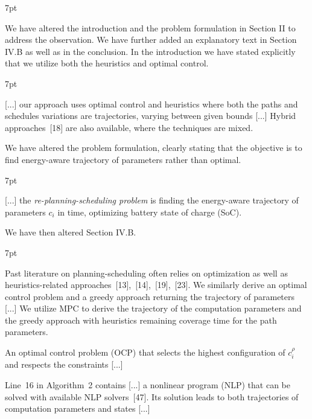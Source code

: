 \documentclass[10pt]{letter}
\newenvironment{formal}{%
  \def\FrameCommand{%
    \hspace{1pt}%
    {\color{red}\vrule width 2pt}%
    {\color{formalshade}\vrule width 4pt}%
    \colorbox{formalshade}%
  }%
  \MakeFramed{\advance\hsize-\width\FrameRestore}%
  \noindent\hspace{-4.55pt}%
  \begin{adjustwidth}{}{7pt}%
  \vspace{2pt}\vspace{2pt}%
}
{%
  \vspace{2pt}\end{adjustwidth}\endMakeFramed%
}
\begin{document}
{\begin{formal}
\begin{algorithmic}[1]
    \vspace*{.8ex}
  \end{algorithmic}
\end{formal}

  We have altered the introduction and the problem formulation in Section II to address the observation. We have further added an explanatory text in Section IV.B as well as in the conclusion. In the introduction we have stated explicitly that we utilize both the heuristics and optimal control.

  \begin{formal}
  {\color{black} [...] our approach uses optimal control {\color{blue} and heuristics} where both the paths and schedules variations are trajectories, varying between given bounds [...]} Hybrid approaches~[{\color{green}18}] are also available, where the techniques are mixed.
  \vspace*{1ex}
  \end{formal}

  We have altered the problem formulation, clearly stating that the objective is to find energy-aware trajectory of parameters rather than optimal.

  \begin{formal}
    {\color{black} [...] the \emph{re-planning-scheduling problem} is finding the {\color{blue}energy-aware} trajectory of parameters $c_i$ in time{\color{blue}, optimizing battery state of charge (SoC)}.}
    \vspace*{1ex}
  \end{formal}

  We have then altered Section IV.B.

  \begin{formal}
  \color{black}
  Past literature on planning-scheduling often relies on %
  optimization {\color{blue} as well as heuristics-}related approaches~[{\color{green}13}],~[{\color{green}14}],~[{\color{green}19}],~[{\color{green}23}]. We similarly derive an optimal control problem {\color{blue}and a greedy approach} returning the trajectory of parameters [...] {\color{blue} We utilize MPC to derive the trajectory of the computation parameters and the greedy approach with heuristics remaining coverage time for the path parameters.}

  An optimal control problem (OCP) that selects the highest configuration of {\color{blue} $c_i^\rho$} and respects the constraints [...]

  Line~{\color{red}16} in Algorithm~{\color{red}2} contains [...] a nonlinear program (NLP) that can be solved with available NLP solvers~[{\color{green}47}]. Its solution leads to both trajectories of {\color{blue} computation} parameters and states [...]
  

\end{formal}}
\end{document}
